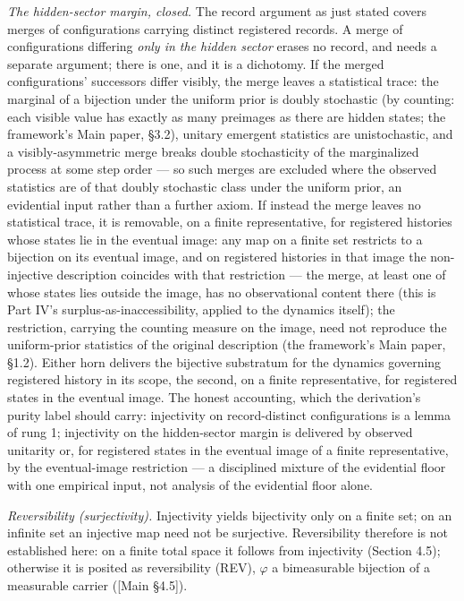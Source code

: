 \documentclass[
]{article}
\begin{document}
\emph{The hidden-sector margin, closed.} The record argument as just
stated covers merges of configurations carrying distinct registered
records. A merge of configurations differing \emph{only in the hidden
sector} erases no record, and needs a separate argument; there is one,
and it is a dichotomy. If the merged configurations' successors differ
visibly, the merge leaves a statistical trace: the marginal of a
bijection under the uniform prior is doubly stochastic (by counting:
each visible value has exactly as many preimages as there are hidden
states; the framework's Main paper, §3.2), unitary emergent statistics
are unistochastic, and a visibly-asymmetric merge breaks double
stochasticity of the marginalized process at some step order --- so such
merges are excluded where the observed statistics are of that doubly
stochastic class under the uniform prior, an evidential input rather
than a further axiom. If instead the merge leaves no statistical trace,
it is removable, on a finite representative, for registered histories
whose states lie in the eventual image: any map on a finite set
restricts to a bijection on its eventual image, and on registered
histories in that image the non-injective description coincides with
that restriction --- the merge, at least one of whose states lies
outside the image, has no observational content there (this is Part IV's
surplus-as-inaccessibility, applied to the dynamics itself); the
restriction, carrying the counting measure on the image, need not
reproduce the uniform-prior statistics of the original description (the
framework's Main paper, §1.2). Either horn delivers the bijective
substratum for the dynamics governing registered history in its scope,
the second, on a finite representative, for registered states in the
eventual image. The honest accounting, which the derivation's purity
label should carry: injectivity on record-distinct configurations is a
lemma of rung 1; injectivity on the hidden-sector margin is delivered by
observed unitarity or, for registered states in the eventual image of a
finite representative, by the eventual-image restriction --- a
disciplined mixture of the evidential floor with one empirical input,
not analysis of the evidential floor alone.

\emph{Reversibility (surjectivity).} Injectivity yields bijectivity only
on a finite set; on an infinite set an injective map need not be
surjective. Reversibility therefore is not established here: on a finite
total space it follows from injectivity (Section 4.5); otherwise it is
posited as reversibility (REV), \(\varphi\) a bimeasurable bijection of
a measurable carrier ({[}Main §4.5{]}).
\end{document}
